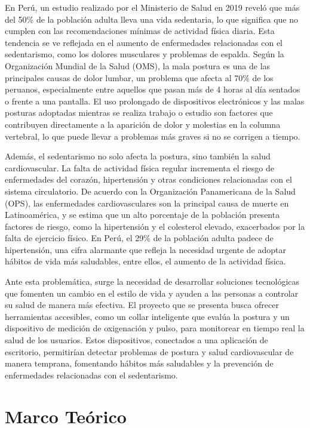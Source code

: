 \documentclass[manuscript,screen,review]{acmart}
\begin{document}
En Perú, un estudio realizado por el Ministerio de Salud en 2019 reveló que más del 50\% de la población adulta lleva una vida sedentaria, lo que significa que no cumplen con las recomendaciones mínimas de actividad física diaria. Esta tendencia se ve reflejada en el aumento de enfermedades relacionadas con el sedentarismo, como los dolores musculares y problemas de espalda. Según la Organización Mundial de la Salud (OMS), la mala postura es una de las principales causas de dolor lumbar, un problema que afecta al 70\% de los peruanos, especialmente entre aquellos que pasan más de 4 horas al día sentados o frente a una pantalla. El uso prolongado de dispositivos electrónicos y las malas posturas adoptadas mientras se realiza trabajo o estudio son factores que contribuyen directamente a la aparición de dolor y molestias en la columna vertebral, lo que puede llevar a problemas más graves si no se corrigen a tiempo.

Además, el sedentarismo no solo afecta la postura, sino también la salud cardiovascular. La falta de actividad física regular incrementa el riesgo de enfermedades del corazón, hipertensión y otras condiciones relacionadas con el sistema circulatorio. De acuerdo con la Organización Panamericana de la Salud (OPS), las enfermedades cardiovasculares son la principal causa de muerte en Latinoamérica, y se estima que un alto porcentaje de la población presenta factores de riesgo, como la hipertensión y el colesterol elevado, exacerbados por la falta de ejercicio físico. En Perú, el 29\% de la población adulta padece de hipertensión, una cifra alarmante que refleja la necesidad urgente de adoptar hábitos de vida más saludables, entre ellos, el aumento de la actividad física.

Ante esta problemática, surge la necesidad de desarrollar soluciones tecnológicas que fomenten un cambio en el estilo de vida y ayuden a las personas a controlar su salud de manera más efectiva. El proyecto que se presenta busca ofrecer herramientas accesibles, como un collar inteligente que evalúa la postura y un dispositivo de medición de oxigenación y pulso, para monitorear en tiempo real la salud de los usuarios. Estos dispositivos, conectados a una aplicación de escritorio, permitirían detectar problemas de postura y salud cardiovascular de manera temprana, fomentando hábitos más saludables y la prevención de enfermedades relacionadas con el sedentarismo.

\section{Marco Te\'orico}
\end{document}
